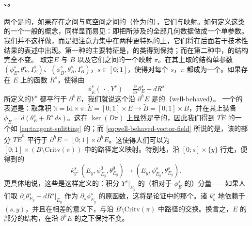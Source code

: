 \paragraph{\trIsomorphism{}、\trDeformation。}\label{sub:isomorphisms-deformations}
两个\trFibrationWithSingularities{}是\trIsomorphic{}的，如果存在\trTotalSpace{}之间与底空间之间的（作为\trExactSymplectic\trCorneredBoundary\trManifold{}的）\trIsomorphism，它们与\trFibration{}映射\trCompatible。如何定义这类\trFibration{}的一个一般的\trDeformation{}概念，同样显而易见：即把所涉及的全部几何数据做成一个单参数\trFamily。我们并不这样做，而是把注意力集中在两种更特殊的\trDeformation{}上，它们将在后面若干技术性结果的表述中出现。第一种的主要特征是，\trRegular\trFiber{}的\trIsomorphism{}类得到保持；而在第二种中，\trFiber{}的结构完全不变。
取定\trManifold{}$E$ 与 $B$ 以及它们之间的一个映射 $\pi$。在其上取\trSmooth{}的\trExactSymplectic{}结构单参数\trFamily{}$(\phi^s_E,\theta^s_E,I^s_E)$、$(\phi^s_B,\theta^s_B,I^s_B)$，$s\in[0;1]$，使得对每个 $s$，$\pi$ 都成为一个\trFibrationWithSingularities。如果存在 $E$ 上\trSmooth{}的函数 $R^s$，使得由
\begin{equation}\label{eq:well-behaved-vector-field}
\phi^s_E(\,\cdot\,,Y^s)=\tfrac{\partial}{\partial s}\theta^s_E-dR^s
\end{equation}
所定义的\trVectorField{}$Y^s$ 都平行于 $\partial^h E$，我们就说这个\trDeformation{}沿 $\partial^h E$ 是\textbf{\trWellBehaved}的（well-behaved）。
一个\trEquivalence{}的表述是：取乘积 $\tilde{\pi}=\mathrm{Id}\times\pi\colon\widetilde{E}=[0;1]\times E\to\widetilde{B}=[0;1]\times B$，并在其\trTotalSpace{}上装备 $\phi_{\widetilde{E}}=d(\theta^s_E+R^s\,ds)$。这在 $\ker(D\tilde{\pi})$ 上显然是辛的，因此我们得到 $T\widetilde{E}$ 的一个如 \eqref{eq:tangent-splitting} 的\trSplitting；而 \eqref{eq:well-behaved-vector-field} 所说的是，该\trSplitting{}的\trHorizontal{}部分 $T\widetilde{E}^h$ 平行于 $\partial^h\widetilde{E}=[0;1]\times\partial^h E$。这使得人们可以为 $[0;1]\times(B\setminus\mathrm{Critv}(\pi))$ 中的路径定义\trParallelTransport{}映射。特别地，沿 $[0;s]\times\{y\}$ 行走，便得到\trExactSymplectic{}的\trIsomorphism
\begin{equation}\label{eq:deformation-fibre-isomorphism}
k^s_y\colon(E_y,\phi^0_{E_y},\theta^0_{E_y})\longrightarrow(E_y,\phi^s_{E_y},\theta^s_{E_y}).
\end{equation}
更具体地说，这些\trIsomorphism{}是这样定义的：积分 $Y^s|_{E_y}$ 的（相对于 $\phi^s_E$ 的）\trVertical{}分量——如果人们取 $\partial_s\theta^s_{E_y}-dR^s|_{E_y}$ 作为 $\partial_s\phi^s_{E_y}$ 的原函数，这将是\trMoser{}论证中的那个\trVectorField。诸 $k^s_y$ \trSmooth{}地依赖于 $(s,y)$，并且在相差\trHamiltonianIsotopy{}的意义下，与沿 $B\setminus\mathrm{Critv}(\pi)$ 中路径的\trParallelTransport{}交换。换言之，$E$ 的\trRegular{}部分的\trFiberBundle{}结构，在沿 $\partial^h E$ \trWellBehaved{}的\trDeformation{}之下保持不变。


